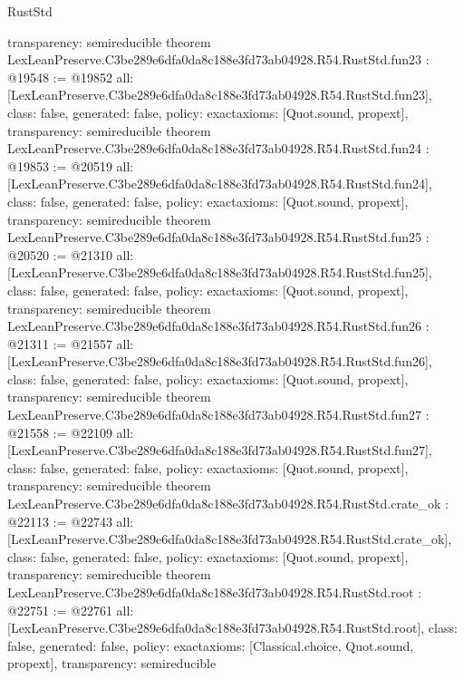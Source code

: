 \begin{lexlean}{RustStd}
\begin{coremodule}
{  transparency: semireducible
}
theorem LexLeanPreserve.C3be289e6dfa0da8c188e3fd73ab04928.R54.RustStd.fun23 : @19548 := @19852 {
  all: [LexLeanPreserve.C3be289e6dfa0da8c188e3fd73ab04928.R54.RustStd.fun23],
  class: false,
  generated: false,
  policy: exact{axioms: [Quot.sound, propext]},
  transparency: semireducible
}
theorem LexLeanPreserve.C3be289e6dfa0da8c188e3fd73ab04928.R54.RustStd.fun24 : @19853 := @20519 {
  all: [LexLeanPreserve.C3be289e6dfa0da8c188e3fd73ab04928.R54.RustStd.fun24],
  class: false,
  generated: false,
  policy: exact{axioms: [Quot.sound, propext]},
  transparency: semireducible
}
theorem LexLeanPreserve.C3be289e6dfa0da8c188e3fd73ab04928.R54.RustStd.fun25 : @20520 := @21310 {
  all: [LexLeanPreserve.C3be289e6dfa0da8c188e3fd73ab04928.R54.RustStd.fun25],
  class: false,
  generated: false,
  policy: exact{axioms: [Quot.sound, propext]},
  transparency: semireducible
}
theorem LexLeanPreserve.C3be289e6dfa0da8c188e3fd73ab04928.R54.RustStd.fun26 : @21311 := @21557 {
  all: [LexLeanPreserve.C3be289e6dfa0da8c188e3fd73ab04928.R54.RustStd.fun26],
  class: false,
  generated: false,
  policy: exact{axioms: [Quot.sound, propext]},
  transparency: semireducible
}
theorem LexLeanPreserve.C3be289e6dfa0da8c188e3fd73ab04928.R54.RustStd.fun27 : @21558 := @22109 {
  all: [LexLeanPreserve.C3be289e6dfa0da8c188e3fd73ab04928.R54.RustStd.fun27],
  class: false,
  generated: false,
  policy: exact{axioms: [Quot.sound, propext]},
  transparency: semireducible
}
theorem LexLeanPreserve.C3be289e6dfa0da8c188e3fd73ab04928.R54.RustStd.crate_ok : @22113 := @22743 {
  all: [LexLeanPreserve.C3be289e6dfa0da8c188e3fd73ab04928.R54.RustStd.crate_ok],
  class: false,
  generated: false,
  policy: exact{axioms: [Quot.sound, propext]},
  transparency: semireducible
}
theorem LexLeanPreserve.C3be289e6dfa0da8c188e3fd73ab04928.R54.RustStd.root : @22751 := @22761 {
  all: [LexLeanPreserve.C3be289e6dfa0da8c188e3fd73ab04928.R54.RustStd.root],
  class: false,
  generated: false,
  policy: exact{axioms: [Classical.choice, Quot.sound, propext]},
  transparency: semireducible
}


\end{coremodule}
\end{lexlean}
